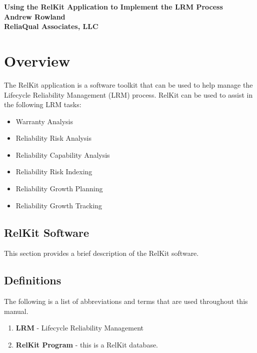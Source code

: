 \documentclass[11pt, 12pt, twoside, onecolumn]{book}
\begin{document}
\selectfont
\normalfont

\captionsetup{labelfont=bf}

\begin{titlepage}
\centering
{\linespread{1.3} \Huge \textbf{Using the RelKit Application to Implement the LRM Process}} \\
\vspace{5in}
{\linespread{1.3} \large \textbf{Andrew Rowland}} \\
{\linespread{1.3} \large \textbf{ReliaQual Associates, LLC}}
\end{titlepage}

\tableofcontents
\newpage

\chapter{Overview}
\FloatBarrier
\noindent The RelKit application is a software toolkit that can be used to help manage the Lifecycle Reliability Management (LRM) process.  RelKit can be used to assist in the following LRM tasks:

	\begin{itemize}
		\item Warranty Analysis
		\item Reliability Risk Analysis
		\item Reliability Capability Analysis
		\item Reliability Risk Indexing
		\item Reliability Growth Planning
		\item Reliability Growth Tracking
	\end{itemize}

\section{RelKit Software}
\FloatBarrier
\noindent This section provides a brief description of the RelKit software.

\section{Definitions}\label{def}
\FloatBarrier
\noindent The following is a list of abbreviations and terms that are used throughout this manual.

	\begin{enumerate}
		\item \textbf{LRM} - Lifecycle Reliability Management
		\item \textbf{RelKit Program} - this is a RelKit database.
	\end{enumerate}
	
\end{document}
